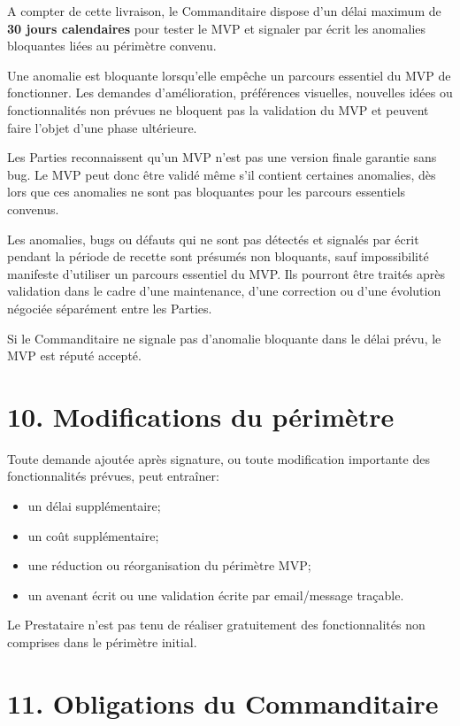 \documentclass[11pt,a4paper]{article}
\begin{document}
A compter de cette livraison, le Commanditaire dispose d'un délai maximum de \textbf{30 jours calendaires} pour tester le MVP et signaler par écrit les anomalies bloquantes liées au périmètre convenu.

Une anomalie est bloquante lorsqu'elle empêche un parcours essentiel du MVP de fonctionner. Les demandes d'amélioration, préférences visuelles, nouvelles idées ou fonctionnalités non prévues ne bloquent pas la validation du MVP et peuvent faire l'objet d'une phase ultérieure.

Les Parties reconnaissent qu'un MVP n'est pas une version finale garantie sans bug. Le MVP peut donc être validé même s'il contient certaines anomalies, dès lors que ces anomalies ne sont pas bloquantes pour les parcours essentiels convenus.

Les anomalies, bugs ou défauts qui ne sont pas détectés et signalés par écrit pendant la période de recette sont présumés non bloquants, sauf impossibilité manifeste d'utiliser un parcours essentiel du MVP. Ils pourront être traités après validation dans le cadre d'une maintenance, d'une correction ou d'une évolution négociée séparément entre les Parties.

Si le Commanditaire ne signale pas d'anomalie bloquante dans le délai prévu, le MVP est réputé accepté.

\section*{10. Modifications du périmètre}

Toute demande ajoutée après signature, ou toute modification importante des fonctionnalités prévues, peut entraîner:

\begin{itemize}
    \item un délai supplémentaire;
    \item un coût supplémentaire;
    \item une réduction ou réorganisation du périmètre MVP;
    \item un avenant écrit ou une validation écrite par email/message traçable.
\end{itemize}

Le Prestataire n'est pas tenu de réaliser gratuitement des fonctionnalités non comprises dans le périmètre initial.

\section*{11. Obligations du Commanditaire}
\end{document}
